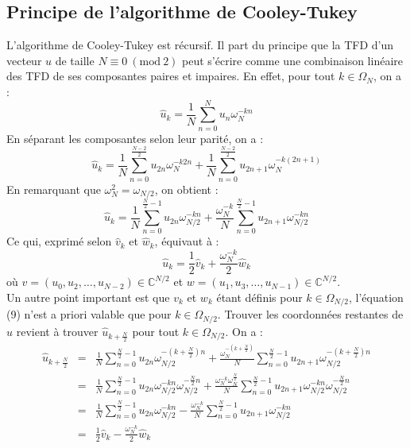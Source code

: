 \documentclass[12pt]{article}
\newcommand{\Mod}[1]{\ (\mathrm{mod}\ #1)}
\begin{document}
\subsection{Principe de l'algorithme de Cooley-Tukey}
L'algorithme de Cooley-Tukey est récursif. Il part du principe que la TFD d'un vecteur $u$ de taille $N\equiv 0\Mod{2}$ peut s'écrire comme une combinaison linéaire des TFD de ses composantes paires et impaires. En effet, pour tout $k\in\Omega_N$, on a : \begin{equation*}
\hat{u}_k=\frac{1}{N}\sum_{n=0}^{N} u_n\omega_N^{-kn}
\end{equation*}
En séparant les composantes selon leur parité, on a :
\begin{equation*}
\hat{u}_k=\frac{1}{N}\sum_{n=0}^{\frac{N-2}{2}} u_{2n}\omega_N^{-k2n}+\frac{1}{N}\sum_{n=0}^{\frac{N-2}{2}} u_{2n+1}\omega_N^{-k(2n+1)}
\end{equation*}
En remarquant que $\omega_N^2=\omega_{N/2}$, on obtient : \begin{equation*}
\hat{u}_k=\frac{1}{N}\sum_{n=0}^{\frac{N}{2}-1} u_{2n}\omega_{N/2}^{-kn}+\frac{\omega_N^{-k}}{N}\sum_{n=0}^{\frac{N}{2}-1} u_{2n+1}\omega_{N/2}^{-kn}
\end{equation*}
Ce qui, exprimé selon $\hat{v}_k$ et $\hat{w}_k$, équivaut à :
\begin{equation*}
\hat{u}_k=\frac{1}{2}\hat{v}_k+\frac{\omega_N^{-k}}{2}\hat{w}_k
\end{equation*}
où $v=(u_0,u_2,\ldots,u_{N-2})\in\mathbb{C}^{N/2}$ et $w=(u_1,u_3,\ldots,u_{N-1})\in\mathbb{C}^{N/2}$.\\
Un autre point important est que $v_k$ et $w_k$ étant définis pour $k\in\Omega_{N/2}$,  l'équation (9) n'est a priori valable que pour $k\in\Omega_{N/2}$. Trouver les coordonnées restantes de $\hat{u}$ revient à trouver $\hat{u}_{k+\frac{N}{2}}$ pour tout $k\in\Omega_{N/2}$. On a :\begin{eqnarray*}
\hat{u}_{k+\frac{N}{2}}&=&\frac{1}{N}\sum_{n=0}^{\frac{N}{2}-1} u_{2n}\omega_{N/2}^{-(k+\frac{N}{2})n}+\frac{\omega_N^{-(k+\frac{N}{2})}}{N}\sum_{n=0}^{\frac{N}{2}-1} u_{2n+1}\omega_{N/2}^{-(k+\frac{N}{2})n}\\
&=&\frac{1}{N}\sum_{n=0}^{\frac{N}{2}-1} u_{2n}\omega_{N/2}^{-kn}\omega_{N/2}^{-\frac{N}{2}n}+\frac{\omega_N^{-k}\omega_N^{\frac{N}{2}}}{N}\sum_{n=0}^{\frac{N}{2}-1} u_{2n+1}\omega_{N/2}^{-kn}\omega_{N/2}^{-\frac{N}{2}n}\\
&=&\frac{1}{N}\sum_{n=0}^{\frac{N}{2}-1} u_{2n}\omega_{N/2}^{-kn}-\frac{\omega_N^{-k}}{N}\sum_{n=0}^{\frac{N}{2}-1} u_{2n+1}\omega_{N/2}^{-kn}\\
&=&\frac{1}{2}\hat{v}_k-\frac{\omega_N^{-k}}{2}\hat{w}_k
\end{eqnarray*}
\end{document}
